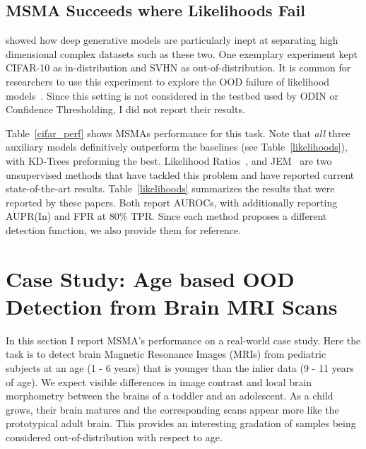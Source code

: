 \subsection*{MSMA Succeeds where Likelihoods Fail}

\cite{nalisnick2018do} showed how deep generative models are particularly inept at separating high dimensional complex datasets such as these two. One exemplary experiment kept CIFAR-10 as in-distribution and SVHN as out-of-distribution. It is common for researchers to use this experiment to explore the OOD failure of likelihood models~\cite{why_norm_fails,Ren2019,Grathwohl2020Your}. Since this setting is not considered in the testbed used by ODIN or Confidence Thresholding, I did not report their results. 

Table~\ref{cifar_perf} shows MSMAs performance for this task. Note that \textit{all} three auxiliary models definitively outperform the baselines (see Table~\ref{likelihoods}), with KD-Trees preforming the best. Likelihood Ratios~\cite{Ren2019}, and JEM~\cite{Grathwohl2020Your} are two unsupervised methods that have tackled this problem and have reported current state-of-the-art results. Table~\ref{likelihoods} summarizes the results that were reported by these papers. Both report AUROCs, with \cite{Ren2019} additionally reporting AUPR(In) and FPR at 80\% TPR. Since each method proposes a different detection function, we also provide them for reference.
\goodbreak

\section{Case Study: Age based OOD Detection from Brain MRI Scans}
\label{sec:brain_experiment}

In this section I report MSMA's performance on a real-world case study. Here the task is to detect brain Magnetic Resonance Images (MRIs) from pediatric subjects at an age (1 - 6 years) that is younger than the inlier data (9 - 11 years of age). We expect visible differences in image contrast and local brain morphometry between the brains of a toddler and an adolescent. As a child grows, their brain matures and the corresponding scans appear more like the prototypical adult brain. This provides an interesting gradation of samples being considered out-of-distribution with respect to age.


